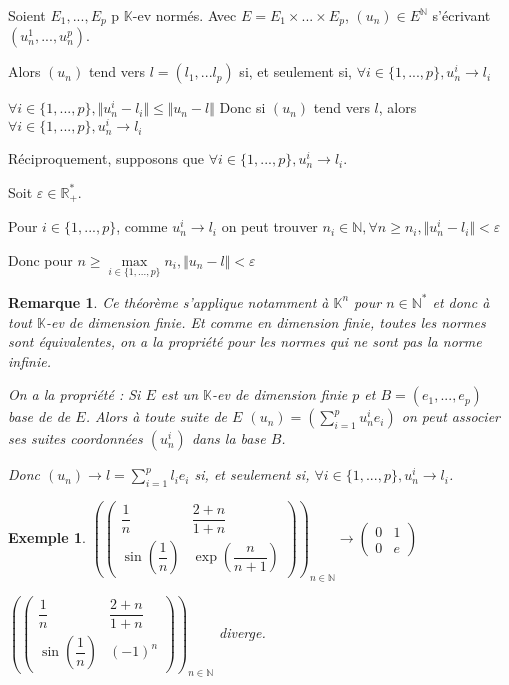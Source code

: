 \documentclass[a4paper,12pt]{book}
\newcommand{\Thr}[2]{\begin{tcolorbox}[sharp corners, colback=white,colframe=red!90!black!75, title=Théorème : #1]#2\end{tcolorbox}}
\newcommand{\Pre}[1]{\begin{tcolorbox}[sharp corners, colback=white,colframe=green!60!green!30!black!75, title=Preuve]#1\end{tcolorbox}}
\newtheorem{Exe}{Exemple}[section]
\newtheorem{Rem}{Remarque}[section]
\def\R{\mathbb{R}}
\def\N{\mathbb{N}}
\def\K{\mathbb{K}}
\begin{document}
\Thr{Convergence dans un produit cartésien fini}{Soient $E_1,...,E_p$ p $\K$-ev normés. Avec $E=E_1\times...\times E_p$, $(u_n)\in E^\N$ s'écrivant $(u_n^1,...,u_n^p)$.
\par Alors $(u_n)$ tend vers $l=(l_1,...l_p)$ si, et seulement si, $\forall i\in\{1,...,p\}, u_n^i\to l_i$}
\Pre{$\forall i\in\{1,...,p\}, \Vert u_n^i - l_i\Vert\leq \Vert u_n-l\Vert$ Donc si $(u_n)$ tend vers $l$, alors $\forall i\in\{1,...,p\}, u_n^i\to l_i$
\par Réciproquement, supposons que $\forall i\in\{1,...,p\}, u_n^i\to l_i$.
\par Soit $\varepsilon\in\R_+^*$.
\par Pour $i\in\{1,...,p\}$, comme $u_n^i\to l_i$ on peut trouver $n_i\in\N, \forall n\geq n_i, \Vert u_n^i-l_i\Vert <\varepsilon$
\par Donc pour $n\geq\max\limits_{i\in\{1,...,p\} } n_i, \Vert u_n-l\Vert<\varepsilon$}
\begin{Rem}
Ce théorème s'applique notamment à $\K^n$ pour $n\in\N^*$ et donc à tout $\K$-ev de dimension finie. Et comme en dimension finie, toutes les normes sont équivalentes, on a la propriété pour les normes qui ne sont pas la norme infinie.
\par On a la propriété : Si $E$ est un $\K$-ev de dimension finie $p$ et $B=(e_1,...,e_p)$ base de de $E$. Alors à toute suite de $E$ $(u_n) =(\sum\limits_{i=1}^pu_n^ie_i)$ on peut associer ses suites coordonnées $(u_n^i)$ dans la base $B$.
\par Donc $(u_n)\to l = \sum\limits_{i=1}^pl_ie_i$ si, et seulement si, $\forall i\in\{1,...,p\}, u_n^i\to l_i$.
\end{Rem}
\begin{Exe}
$\left(\begin{pmatrix} \dfrac{1}{n} & \dfrac{2+n}{1+n} \\ \sin\left(\dfrac{1}{n}\right) & \exp\left(\dfrac{n}{n+1}\right) \end{pmatrix}\right)_{n\in\N} \to \begin{pmatrix} 0 & 1 \\ 0 & e \end{pmatrix}$
\par $\left(\begin{pmatrix} \dfrac{1}{n} & \dfrac{2+n}{1+n} \\ \sin\left(\dfrac{1}{n}\right) & (-1)^n \end{pmatrix}\right)_{n\in\N}$ diverge.
\end{Exe}
\end{document}
